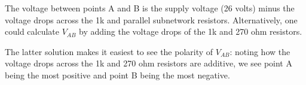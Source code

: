 The voltage between points A and B is the supply voltage (26 volts) minus the voltage drops across the 1k and parallel subnetwork resistors.  Alternatively, one could calculate $V_{AB}$ by adding the voltage drops of the 1k and 270 ohm resistors.

The latter solution makes it easiest to see the polarity of $V_{AB}$: noting how the voltage drops across the 1k and 270 ohm resistors are additive, we see point A being the most positive and point B being the most negative.











